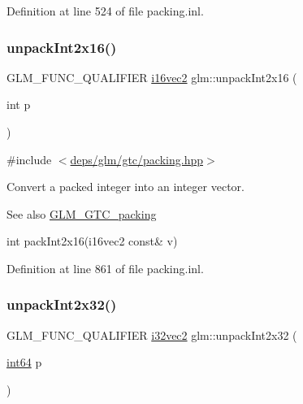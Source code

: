 Definition at line 524 of file packing.\+inl.

\mbox{\label{group__gtc__packing_ga639c216b452fc364b32c15eb5b8b6a87}} 
\subsubsection{\texorpdfstring{unpack\+Int2x16()}{unpackInt2x16()}}
{\footnotesize\ttfamily G\+L\+M\+\_\+\+F\+U\+N\+C\+\_\+\+Q\+U\+A\+L\+I\+F\+I\+ER \hyperlink{group__gtc__type__precision_gad912fd04abb876a5b806118ec6e0f283}{i16vec2} glm\+::unpack\+Int2x16 (\begin{DoxyParamCaption}\item[{int}]{p }\end{DoxyParamCaption})}



{\ttfamily \#include $<$\hyperlink{gtc_2packing_8hpp}{deps/glm/gtc/packing.\+hpp}$>$}

Convert a packed integer into an integer vector.

\begin{DoxySeeAlso}{See also}
\hyperlink{group__gtc__packing}{G\+L\+M\+\_\+\+G\+T\+C\+\_\+packing} 

int pack\+Int2x16(i16vec2 const\& v) 
\end{DoxySeeAlso}


Definition at line 861 of file packing.\+inl.

\mbox{\label{group__gtc__packing_ga6410b50fa48d15e70b2c34174ee4a3fc}} 
\subsubsection{\texorpdfstring{unpack\+Int2x32()}{unpackInt2x32()}}
{\footnotesize\ttfamily G\+L\+M\+\_\+\+F\+U\+N\+C\+\_\+\+Q\+U\+A\+L\+I\+F\+I\+ER \hyperlink{group__gtc__type__precision_ga99191e0de942ecc1df32d522f8064789}{i32vec2} glm\+::unpack\+Int2x32 (\begin{DoxyParamCaption}\item[{\hyperlink{group__gtc__type__precision_ga435d75819cce297cc5fa21bd84ef89a5}{int64}}]{p }\end{DoxyParamCaption})}



